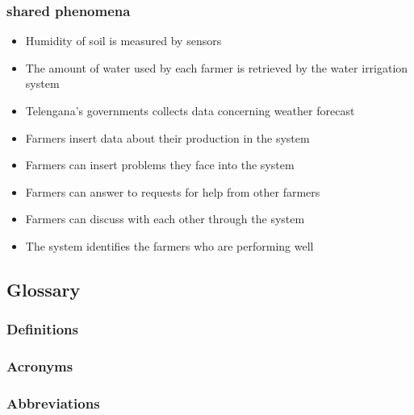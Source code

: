 \subsubsection{shared phenomena}

\begin{itemize}
    \item Humidity of soil is measured by sensors 
    \item The amount of water used by each farmer is retrieved by the water irrigation system
    \item Telengana's governments collects data concerning weather forecast
    \item Farmers insert data about their production in the system
    \item Farmers can insert problems they face into the system
    \item Farmers can answer to requests for help from other farmers
    \item Farmers can discuss with each other through the system
    \item The system identifies the farmers who are performing well
\end{itemize}

\subsection{Glossary}
\subsubsection{Definitions}
\subsubsection{Acronyms}
\subsubsection{Abbreviations}

